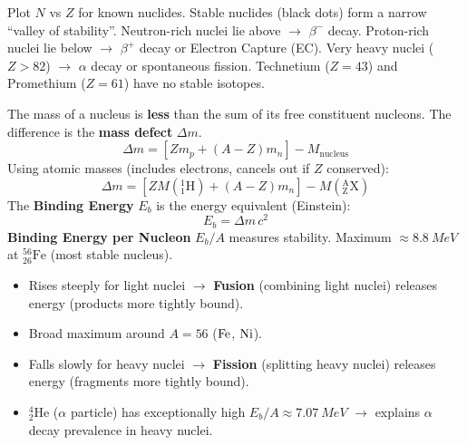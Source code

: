 \documentclass[11pt]{article}
\begin{document}
\begin{experience}
Plot $N$ vs $Z$ for known nuclides. Stable nuclides (black dots) form a narrow ``valley of stability''. Neutron-rich nuclei lie above $\to$ $\beta^-$ decay. Proton-rich nuclei lie below $\to$ $\beta^+$ decay or Electron Capture (EC). Very heavy nuclei ($Z > 82$) $\to$ $\alpha$ decay or spontaneous fission. Technetium ($Z=43$) and Promethium ($Z=61$) have no stable isotopes.
\end{experience}

\begin{propriete}
The mass of a nucleus is \textbf{less} than the sum of its free constituent nucleons. The difference is the \textbf{mass defect} $\Delta m$.
\[
\Delta m = \left[ Z m_p + (A-Z) m_n \right] - M_{\text{nucleus}}
\]
Using atomic masses (includes electrons, cancels out if $Z$ conserved):
\[
\Delta m = \left[ Z M(\ensuremath{\mathrm{^{1}_{1}H}}) + (A-Z) m_n \right] - M(\ensuremath{\mathrm{^{A}_{Z}X}})
\]
The \textbf{Binding Energy} $E_b$ is the energy equivalent (Einstein):
\[
E_b = \Delta m \, c^2
\]
\textbf{Binding Energy per Nucleon} $E_b/A$ measures stability. Maximum $\approx \SI{8.8}{MeV}$ at $\ensuremath{\mathrm{^{56}_{26}Fe}}$ (most stable nucleus).
\end{propriete}

\begin{aretenir}
\begin{itemize}
\item Rises steeply for light nuclei $\to$ \textbf{Fusion} (combining light nuclei) releases energy (products more tightly bound).
\item Broad maximum around $A=56$ ($\ce{Fe}$, $\ce{Ni}$).
\item Falls slowly for heavy nuclei $\to$ \textbf{Fission} (splitting heavy nuclei) releases energy (fragments more tightly bound).
\item $\ensuremath{\mathrm{^{4}_{2}He}}$ ($\alpha$ particle) has exceptionally high $E_b/A \approx \SI{7.07}{MeV}$ $\to$ explains $\alpha$ decay prevalence in heavy nuclei.
\end{itemize}
\end{aretenir}
\end{document}
